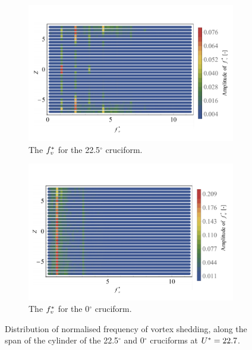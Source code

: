 \documentclass[oneside]{utmthesis}
\begin{document}
\begin{figure}
  \centering

  \begin{subfigure}[h]{1\textwidth}
    \includegraphics[width=\textwidth]{figs/probe225YU10}
    \caption{The $f^{*}_{v}$ for the 22.5$^{\circ}$ cruciform.}
    \label{fig:probe225YU10}
  \end{subfigure}

  \begin{subfigure}[h]{1\textwidth}
    \includegraphics[width=\textwidth]{figs/probe00YU10}
    \caption{The $f^{*}_{v}$ for the 0$^{\circ}$ cruciform.}
    \label{fig:probe00YU10}
  \end{subfigure}

  \caption{Distribution of normalised frequency of vortex shedding, along the span of the cylinder of the 22.5$^{\circ}$ and 0$^{\circ}$ cruciforms at $U^{*} = 22.7$.}
  \label{fig:probe22500YU10}
\end{figure}
\end{document}

